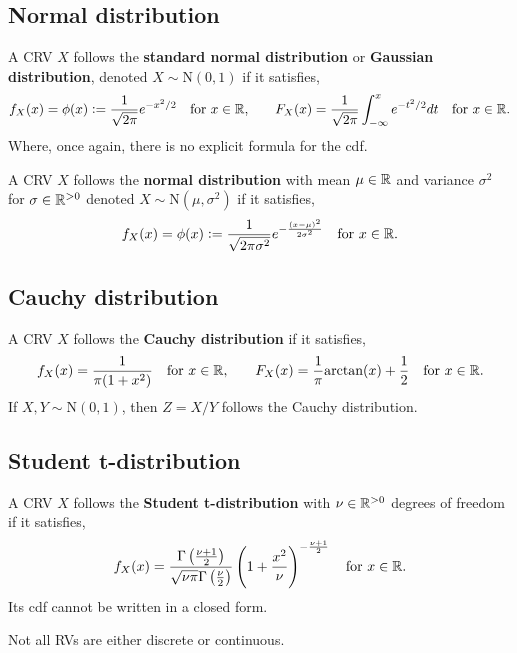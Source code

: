 \documentclass[../Year1/Year1.tex]{subfiles}
\begin{document}
\subsection{Normal distribution}
\begin{definition}
    A CRV $X$ follows the \textbf{standard normal distribution} or \textbf{Gaussian distribution}, denoted $X\sim\text{N}(0,1)$ if it satisfies, \[
        f_X(x) = \phi(x) := \frac{1}{\sqrt{2\pi}}e^{-x^2/2} \quad
        \text{\textcolor{black}{for }$x\in\mathbb{R}$}\textcolor{black}{,}
        \qquad
        F_X(x) = \frac{1}{\sqrt{2\pi}}\int_{-\infty}^xe^{-t^2/2}dt \quad
        \text{\textcolor{black}{for }$x\in\mathbb{R}$}\textcolor{black}{.}
    \]
    Where, once again, there is no explicit formula for the cdf.
\end{definition}

\begingroup\belowdisplayskip=-10pt
\begin{definition}
    A CRV $X$ follows the \textbf{normal distribution} with mean $\mu\in\mathbb{R}$ and variance $\sigma^2$ for $\sigma\in\mathbb{R}^{>0}$ denoted $X\sim\text{N}(\mu,\sigma^2)$ if it satisfies, \[
        f_X(x) = \phi(x) := \frac{1}{\sqrt{2\pi\sigma^2}}e^{-\frac{(x-\mu)^2}{2\sigma^2}} \quad
        \text{\textcolor{black}{for }$x\in\mathbb{R}$}\textcolor{black}{.}
    \]
\end{definition}
\endgroup
\subsection{Cauchy distribution}
\begin{definition}
    A CRV $X$ follows the \textbf{Cauchy distribution} if it satisfies, \[
        f_X(x) = \frac{1}{\pi(1+x^2)} \quad
        \text{\textcolor{black}{for }$x\in\mathbb{R}$}\textcolor{black}{,}
        \qquad
        F_X(x) = \frac{1}{\pi}\text{arctan}(x)+\frac{1}{2} \quad
        \text{\textcolor{black}{for }$x\in\mathbb{R}$}\textcolor{black}{.}
    \]
    If $X,Y\sim \text{N}(0,1)$, then $Z=X/Y$ follows the Cauchy distribution.
\end{definition}
\subsection{Student t-distribution}
\begin{definition}
    A CRV $X$ follows the \textbf{Student t-distribution} with $\nu\in\mathbb{R}^{>0}$ degrees of freedom if it satisfies, \[
        f_X(x) = \frac
        {\Gamma\left(\frac{\nu+1}{2}\right)}
        {\sqrt{\nu\pi}\Gamma\left(\frac{\nu}{2}\right)}
        \left(1 + \frac{x^2}{\nu}\right)^{-\frac{\nu+1}{2}}
        \quad
        \text{\textcolor{black}{for }$x\in\mathbb{R}$}\textcolor{black}{.}
    \]
    Its cdf cannot be written in a closed form.
\end{definition}
\begin{remark}
    Not all RVs are either discrete or continuous.
\end{remark}
\end{document}
